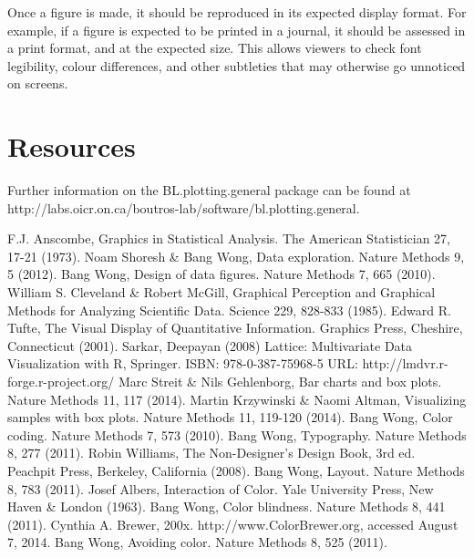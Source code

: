 \documentclass[letterpaper]{article}
\begin{document}
Once a figure is made, it should be reproduced in its expected display format. For example, if a figure is expected to be printed in a journal, it should be assessed in a print format, and at the expected size. This allows viewers to check font legibility, colour differences, and other subtleties that may otherwise go unnoticed on screens.

\section{Resources}
Further information on the BL.plotting.general package can be found at  http://labs.oicr.on.ca/boutros-lab/software/bl.plotting.general.

\begin{thebibliography}{1}
F.J. Anscombe, Graphics in Statistical Analysis. The American Statistician 27, 17-21 (1973).
Noam Shoresh \& Bang Wong, Data exploration. Nature Methods 9, 5 (2012).
Bang Wong, Design of data figures. Nature Methods 7, 665 (2010).
William S. Cleveland \& Robert McGill, Graphical Perception and Graphical Methods for Analyzing Scientific Data. Science 229, 828-833 (1985).
Edward R. Tufte, The Visual Display of Quantitative Information. Graphics Press, Cheshire, Connecticut (2001).
Sarkar, Deepayan (2008) Lattice: Multivariate Data Visualization with R, Springer.  ISBN: 978-0-387-75968-5 URL: http://lmdvr.r-forge.r-project.org/
Marc Streit \& Nils Gehlenborg, Bar charts and box plots. Nature Methods 11, 117 (2014).
Martin Krzywinski \& Naomi Altman, Visualizing samples with box plots. Nature Methods 11, 119-120 (2014).
Bang Wong, Color coding. Nature Methods 7, 573 (2010).
Bang Wong, Typography. Nature Methods 8, 277 (2011).
Robin Williams, The Non-Designer's Design Book, 3rd ed. Peachpit Press, Berkeley, California (2008).
Bang Wong, Layout. Nature Methods 8, 783 (2011).
Josef Albers, Interaction of Color. Yale University Press, New Haven \& London (1963).
Bang Wong, Color blindness. Nature Methods 8, 441 (2011).
Cynthia A. Brewer, 200x. http://www.ColorBrewer.org, accessed August 7, 2014.
Bang Wong, Avoiding color. Nature Methods 8, 525 (2011).

\end{thebibliography}
\end{document}
